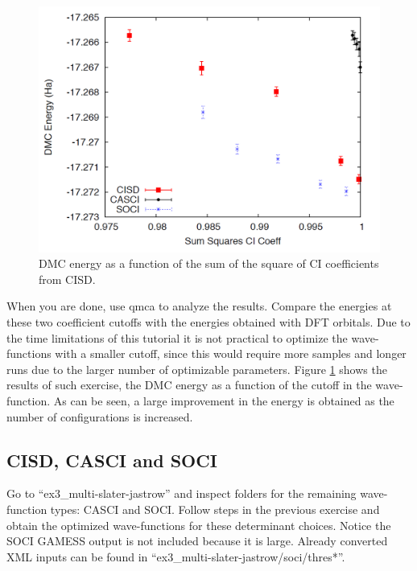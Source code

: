 \begin{figure}
\begin{center}
\includegraphics[trim = 0mm 0mm 0mm 0mm, clip,width=0.75\columnwidth]{./figures/lab_advanced_molecules_dmc_ci_cisd}
\end{center}
\caption{DMC energy as a function of the sum of the square of CI coefficients from CISD.
\label{fig:lam_dmc_ci_cisd}
}
\end{figure}

When you are done, use qmca to analyze the results. Compare the energies at these two
coefficient cutoffs with the energies obtained with DFT orbitals. Due to the time limitations of this tutorial it is not practical to optimize the wave-functions with a smaller cutoff, since this would require more samples and longer runs due to the larger number of optimizable parameters. Figure \ref{fig:lam_dmc_ci_cisd} shows the results of such exercise, the DMC energy as a function of the cutoff in the wave-function. As can be seen, a large improvement in the energy is obtained as the number of configurations is increased.



\subsection{CISD, CASCI and SOCI}

Go to “ex3\_multi-slater-jastrow” and inspect folders for the remaining wave-function types: CASCI and SOCI. Follow steps in the previous exercise and obtain the optimized wave-functions for these determinant choices. Notice the SOCI GAMESS output is not included because it is large. Already converted XML inputs can be found in ``ex3\_multi-slater-jastrow/soci/thres*''. %

